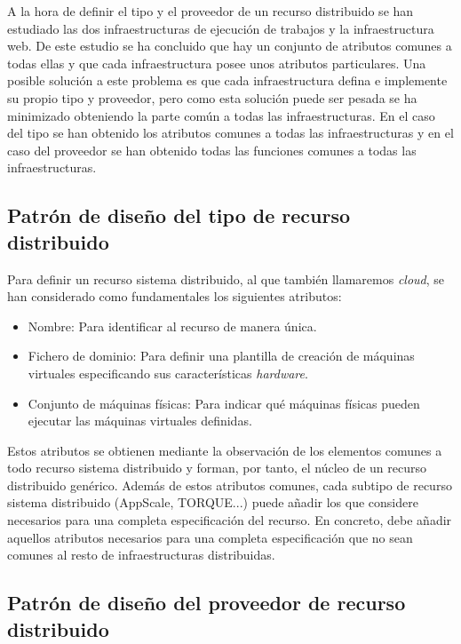 A la hora de definir el tipo y el proveedor de un recurso distribuido se han estudiado las dos infraestructuras de ejecución de trabajos y la infraestructura web. De este estudio se ha concluido que hay un conjunto de atributos comunes a todas ellas y que cada infraestructura posee unos atributos particulares. Una posible solución a este problema es que cada infraestructura defina e implemente su propio tipo y proveedor, pero como esta solución puede ser pesada se ha minimizado obteniendo la parte común a todas las infraestructuras. En el caso del tipo se han obtenido los atributos comunes a todas las infraestructuras y en el caso del proveedor se han obtenido todas las funciones comunes a todas las infraestructuras.


\subsection{Patrón de diseño del tipo de recurso distribuido}
\label{sec:modelado-tipo}

Para definir un recurso sistema distribuido, al que también llamaremos \emph{cloud}, se han considerado como fundamentales los siguientes atributos:

\begin{itemize}
\item Nombre: Para identificar al recurso de manera única.
\item Fichero de dominio: Para definir una plantilla de creación de máquinas virtuales especificando sus características \emph{hardware}.
\item Conjunto de máquinas físicas: Para indicar qué máquinas físicas pueden ejecutar las máquinas virtuales definidas.
\end{itemize}

Estos atributos se obtienen mediante la observación de los elementos comunes a todo recurso sistema distribuido y forman, por tanto, el núcleo de un recurso distribuido genérico. Además de estos atributos comunes, cada subtipo de recurso sistema distribuido (AppScale, TORQUE...) puede añadir los que considere necesarios para una completa especificación del recurso. En concreto, debe añadir aquellos atributos necesarios para una completa especificación que no sean comunes al resto de infraestructuras distribuidas.


\subsection{Patrón de diseño del proveedor de recurso distribuido}
\label{sec:modelado-proveedor}

